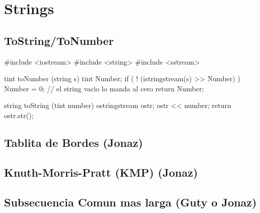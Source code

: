 \section{Strings}

\subsection{ToString/ToNumber}
\begin{code}
#include <iostream>
#include <string>
#include <sstream>

tint toNumber (string s)
{
	tint Number;
	if ( ! (istringstream(s) >> Number) )
		Number = 0; // el string vacio lo manda al cero
	return Number;
}

string toString (tint number)
{    
    ostringstream ostr;
    ostr << number;
    return  ostr.str();
}
\end{code}

\subsection{Tablita de Bordes (Jonaz)}
\begin{code}
\end{code}

\subsection{Knuth-Morris-Pratt (KMP) (Jonaz)}
\begin{code}
\end{code}

\subsection{Subsecuencia Comun mas larga (Guty o Jonaz)}
\begin{code}
\end{code}

